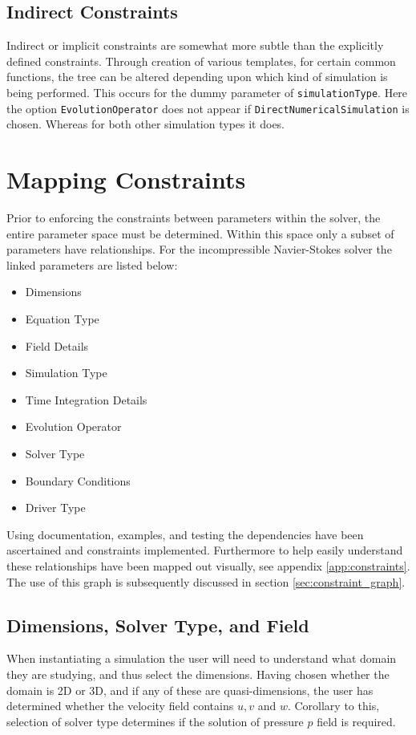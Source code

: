 \documentclass[11pt, a4paper]{report}
\begin{document}
\subsection{Indirect Constraints}
Indirect or implicit constraints are somewhat more subtle than the explicitly defined constraints. Through creation of various templates, for certain common functions, the tree can be altered depending upon which kind of simulation is being performed. This occurs for the dummy parameter of \texttt{simulationType}. Here the option \texttt{EvolutionOperator} does not appear if \texttt{DirectNumericalSimulation} is chosen. Whereas for both other simulation types it does.

\section{Mapping Constraints}
Prior to enforcing the constraints between parameters within the solver, the entire parameter space must be determined. Within this space only a subset of parameters have relationships. For the incompressible Navier-Stokes solver the linked parameters are listed below:
\begin{multicols}{3}
\begin{itemize}
\item Dimensions 
\item Equation Type
\item Field Details
\item Simulation Type
\item Time Integration Details
\item Evolution Operator
\item Solver Type
\item Boundary Conditions
\item Driver Type
\end{itemize}
\end{multicols}
Using documentation, examples, and testing the dependencies have been ascertained and constraints implemented. Furthermore to help easily understand these relationships have been mapped out visually, see appendix \ref{app:constraints}. The use of this graph is subsequently discussed in section \ref{sec:constraint_graph}.

\subsection{Dimensions, Solver Type, and Field}
When instantiating a simulation the user will need to understand what domain they are studying, and thus select the dimensions. Having chosen whether the domain is 2D or 3D, and if any of these are quasi-dimensions, the user has determined whether the velocity field contains $u, v$ and $w$. Corollary to this, selection of solver type determines if the solution of pressure $p$ field is required.
\end{document}
